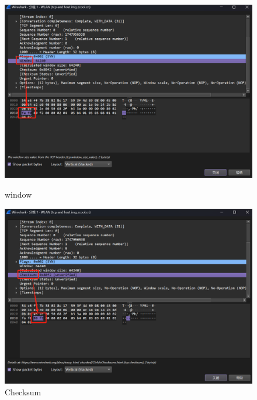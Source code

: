 \documentclass{article}
\begin{document}
	\begin{figure}[H]
		\centering
		\begin{minipage}[b]{0.45\textwidth}
			\includegraphics[width=\textwidth]{images/11.Window.png}
			\caption{window}
		\end{minipage}
		\hfill
		\begin{minipage}[b]{0.45\textwidth}
			\includegraphics[width=\textwidth]{images/12.Checksum.png}
			\caption{Checksum}
		\end{minipage}
	\end{figure}
	
\end{document}
